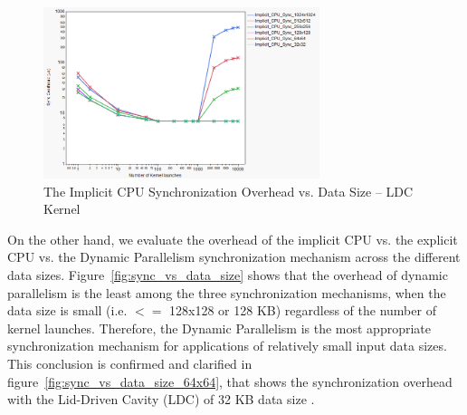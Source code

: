 \documentclass[conference]{IEEEtran}
\begin{document}
\begin{figure}
	\includegraphics[width=1.0\columnwidth, height=5cm]{All_data_sizes_vs_number_kernel_launch.png}
	\caption{The Implicit CPU Synchronization Overhead vs. Data Size -- LDC Kernel}
	\label{fig:implicit_vs_data_size}
\end{figure}

On the other hand, we evaluate the overhead of the implicit CPU vs. the explicit CPU vs. the Dynamic Parallelism synchronization mechanism across the different data sizes. Figure~\ref{fig:sync_vs_data_size} shows that the overhead of dynamic parallelism is the least among the three synchronization mechanisms, when the data size is small (i.e. $<=$ 128x128 or 128 KB) regardless of the number of kernel launches. Therefore, the Dynamic Parallelism is the most appropriate synchronization mechanism for applications of relatively small input data sizes. This conclusion is confirmed and clarified in figure~\ref{fig:sync_vs_data_size_64x64}, that shows the synchronization overhead with the Lid-Driven Cavity (LDC) of 32 KB data size .
\end{document}
